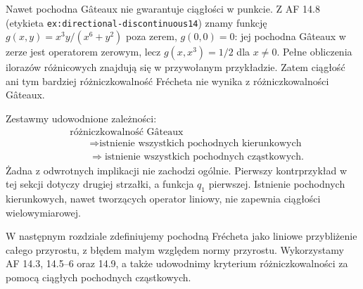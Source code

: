 Nawet pochodna Gâteaux nie gwarantuje ciągłości
w punkcie. Z AF 14.8 (etykieta
\texttt{ex:directional-discontinuous14}) znamy
funkcję $g(x,y)=x^3y/(x^6+y^2)$ poza zerem,
$g(0,0)=0$: jej pochodna Gâteaux w zerze jest
operatorem zerowym, lecz $g(x,x^3)=1/2$ dla $x\ne0$.
Pełne obliczenia ilorazów różnicowych znajdują się
w przywołanym przykładzie. Zatem ciągłość ani tym
bardziej różniczkowalność Frécheta nie wynika z
różniczkowalności Gâteaux.

Zestawmy udowodnione zależności:
\begin{align*}
 &\text{różniczkowalność Gâteaux}\\
 &\qquad\Longrightarrow \text{istnienie wszystkich pochodnych kierunkowych}\\
 &\qquad\Longrightarrow \text{istnienie wszystkich pochodnych cząstkowych}.
\end{align*}
Żadna z odwrotnych implikacji nie zachodzi ogólnie.
Pierwszy kontrprzykład w tej sekcji dotyczy drugiej
strzałki, a funkcja $q_1$ pierwszej. Istnienie pochodnych
kierunkowych, nawet tworzących operator liniowy,
nie zapewnia ciągłości wielowymiarowej.

W następnym rozdziale zdefiniujemy pochodną Frécheta
jako liniowe przybliżenie całego przyrostu, z błędem
małym względem normy przyrostu. Wykorzystamy AF 14.3,
14.5--6 oraz 14.9, a także udowodnimy kryterium
różniczkowalności za pomocą ciągłych pochodnych
cząstkowych.
